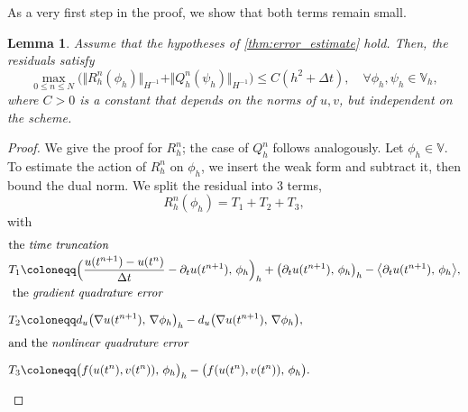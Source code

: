 \documentclass[11pt, a4paper]{amsart}
\newcommand{\la}{\langle}
\newcommand{\ra}{\rangle}
\newcommand{\VV}{\mathbb{V}}
\newtheorem{lemma}[theorem]{Lemma}%
\numberwithin{equation}{section}
\begin{document}
	As a very first step in the proof, we show that both terms remain small.	
	\begin{lemma}\label{lem:residuals}
		Assume that the hypotheses of \cref{thm:error_estimate} hold. Then, the residuals satisfy  
		\begin{equation*}
			\max_{0\leq n\leq N} \Big(\Vert R_h^n(\phi_h)\Vert_{H^{-1}} + \Vert Q_h^n(\psi_h)\Vert_{H^{-1}}\Big)\leq C(h^2 + \Delta t),\quad\forall \phi_h,\psi_h\in \VV_h,
		\end{equation*}
		where $C>0$ is a constant that depends on the norms of $u,v$, but independent on the scheme.
	\end{lemma}
	\begin{proof}
		We give the proof for $R_h^n$; the case of $Q_h^n$ follows analogously.
		Let $\phi_h\in \VV$. To estimate the action of $R_h^n$ on $\phi_h$, we insert the weak form and subtract it, then bound the dual norm. We split the residual into 3 terms,
		\begin{equation*}
			R_h^n(\phi_h) = T_1 + T_2 + T_3,
		\end{equation*}
		with  
		\begin{align*}
			\intertext{the \textit{time truncation}}
			T_1&\coloneqq \Big( \frac{u(t^{n+1}) - u(t^n)}{\Delta t} - \partial_t u(t^{n+1}),\, \phi_h \Big)_h  +  \big(\partial_t u(t^{n+1}),\, \phi_h\big)_h - \big\la\partial_t u(t^{n+1}),\, \phi_h \big\ra,
			\\
			\intertext{  the \textit{gradient quadrature error}}
			T_2&\coloneqq d_u \big( \nabla u(t^{n+1}), \,\nabla \phi_h \big)_h- d_u \big( \nabla u(t^{n+1}), \,\nabla \phi_h \big),
			\vphantom{\Big( \frac{u(t^{n+1}) - u(t^n)}{\Delta t} - \partial_t u(t^{n+1}),\, \phi_h \Big)_h}
			\\
			\intertext{and the \textit{nonlinear quadrature error}}
			T_3&\coloneqq \big( f(u(t^n),v(t^n)), \, \phi_h \big)_h - \big(f(u(t^n),v(t^n)),\, \phi_h \big).
			\vphantom{\Big( \frac{u(t^{n+1}) - u(t^n)}{\Delta t} - \partial_t u(t^{n+1}), \,\phi_h \Big)_h}
		\end{align*}
		


\end{proof}
\end{document}
